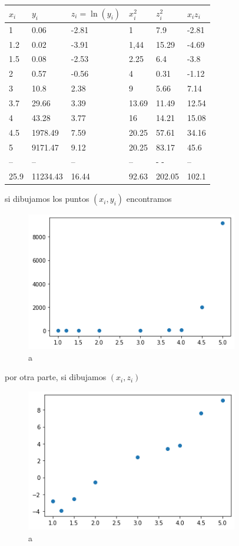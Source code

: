\documentclass[
]{article}
\begin{document}
\begin{longtable}[]{@{}llllll@{}}
\toprule
\(x_i\) & \(y_i\) & \(z_i = \ln(y_i)\) & \(x_i^2\) & \(z_i^2\) &
\(x_i z_i\)\tabularnewline
\midrule
\endhead
1 & 0.06 & -2.81 & 1 & 7.9 & -2.81\tabularnewline
1.2 & 0.02 & -3.91 & 1,44 & 15.29 & -4.69\tabularnewline
1.5 & 0.08 & -2.53 & 2.25 & 6.4 & -3.8\tabularnewline
2 & 0.57 & -0.56 & 4 & 0.31 & -1.12\tabularnewline
3 & 10.8 & 2.38 & 9 & 5.66 & 7.14\tabularnewline
3.7 & 29.66 & 3.39 & 13.69 & 11.49 & 12.54\tabularnewline
4 & 43.28 & 3.77 & 16 & 14.21 & 15.08\tabularnewline
4.5 & 1978.49 & 7.59 & 20.25 & 57.61 & 34.16\tabularnewline
5 & 9171.47 & 9.12 & 20.25 & 83.17 & 45.6\tabularnewline
-- & -- & -- & -- & - - & --\tabularnewline
25.9 & 11234.43 & 16.44 & 92.63 & 202.05 & 102.1\tabularnewline
\bottomrule
\end{longtable}

si dibujamos los puntos \((x_i,y_i)\) encontramos

\begin{figure}
\centering
\includegraphics[width=3.64583in,height=\textheight]{exponential_regression.png}
\caption{a}
\end{figure}

por otra parte, si dibujamos \((x_i,z_i)\)

\begin{figure}
\centering
\includegraphics[width=3.64583in,height=\textheight]{exponential_regression2.png}
\caption{a}
\end{figure}
\end{document}
